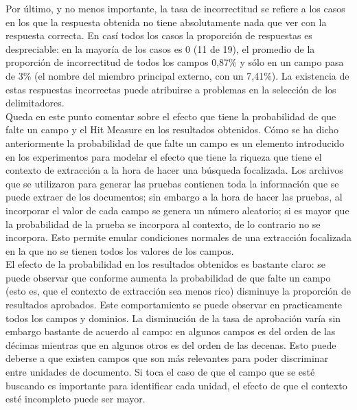Por último, y no menos importante, la tasa de incorrectitud se refiere a los casos en los que la respuesta obtenida no tiene absolutamente nada que ver con la respuesta correcta. En casí todos los casos la proporción de respuestas es despreciable: en la mayoría de los casos es 0 (11 de 19),  el promedio de la proporción de incorrectitud de todos los campos 0,87\% y sólo en un campo pasa de 3\% (el nombre del miembro principal externo, con un 7,41\%). La existencia de estas respuestas incorrectas puede atribuirse a problemas en la selección de los delimitadores. \\

Queda en este punto comentar sobre el efecto que tiene la probabilidad de que falte un campo y el Hit Measure en los resultados obtenidos. Cómo se ha dicho anteriormente la probabilidad de que falte un campo es un elemento introducido en los experimentos para modelar el efecto que tiene la riqueza que tiene el contexto de extracción a la hora de hacer una búsqueda focalizada. Los archivos que se utilizaron para generar las pruebas contienen toda la información que se puede extraer de los documentos; sin embargo a la hora de hacer las pruebas, al incorporar el valor de cada campo se genera un número aleatorio; si es mayor que la probabilidad de la prueba se incorpora al contexto, de lo contrario no se incorpora. Esto permite emular condiciones normales de una extracción focalizada en la que no se tienen todos los valores de los campos. \\

El efecto de la probabilidad en los resultados obtenidos es bastante claro: se puede observar que conforme aumenta la probabilidad de que falte un campo (esto es, que el contexto de extracción sea menos rico) disminuye la proporción de resultados aprobados. Este comportamiento se puede observar en practicamente todos los campos y dominios. La disminución de la tasa de aprobación varía sin embargo bastante de acuerdo al campo: en algunos campos es del orden de las décimas mientras que en algunos otros es del orden de las decenas. Esto puede deberse a que existen campos que son más relevantes para poder discriminar entre unidades de documento. Si toca el caso de que el campo que se esté buscando es importante para identificar cada unidad, el efecto de que el contexto esté incompleto puede ser mayor. \\


